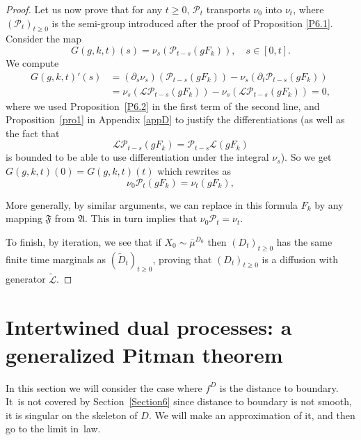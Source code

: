 \documentclass[10pt]{amsart}
\theoremstyle{plain}
\theoremstyle{definition}
\newcommand{\SL}{{\mathscr L}}
\newcommand{\SP}{{\mathscr P}}
\let\wi\widetilde
\newcommand{\fA}{\mathfrak{A}}
\newcommand{\fF}{\mathfrak{F}}
\begin{document}
\begin{proof}
Let us now prove that for any $t\geq 0$, $\SP_t$ transports $\nu_0$ into $\nu_t$, where $(\SP_t)_{t\geq 0}$ is the semi-group introduced after the proof of Proposition \ref{P6.1}. Consider the map
\begin{equation}
G(g,k,t)(s)=\nu_s\left(\SP_{t-s}(gF_k)\right), \quad s\in[0,t].
\end{equation}
We compute
\begin{equation}
\begin{split}
G(g,k,t)'(s)&=(\partial_s\nu_s)\left(\SP_{t-s}(gF_k)\right)-\nu_s\left(\partial_t\SP_{t-s}(gF_k)\right)\\
&=\nu_s\left(\SL \SP_{t-s}(gF_k)\right)-\nu_s\left(\SL \SP_{t-s}(gF_k)\right)=0,
\end{split}
\end{equation}
where we used Proposition~\ref{P6.2} in the first term of the second line, and Proposition~\ref{pro1} in Appendix \ref{appD} to justify the differentiations (as well as the fact that
\[
\SL \SP_{t-s}(gF_k)=\SP_{t-s}\SL (gF_k)
\]
is bounded to be able to use differentiation under the integral $\nu_s$).
So we get $ G(g,k,t)(0)=G(g,k,t)(t)$ which rewrites as
\begin{equation}
\nu_0\SP_t(gF_k)=\nu_t(gF_k),
\end{equation}\par
More generally, by similar arguments, we can replace in this formula $F_k$ by any mapping $\fF$ from $\fA$.
This in turn implies that $\nu_0\SP_t=\nu_t$.
\par
To finish, by iteration, we see that if $X_0\sim \bar\mu^{D_0}$ then $(D_t)_{t\ge0}$ has the same finite time marginals as $(\wi D_t)_{t\ge0}$, proving that $(D_t)_{t\ge0}$ is a diffusion with generator $\wi \SL$.
\end{proof}

\section{Intertwined dual processes: a generalized Pitman theorem}
\label{Section4}

In this section we will consider the case where $f^D$ is the distance to boundary. It~is not covered by Section~\ref{Section6} since distance to boundary is not smooth, it is singular on the skeleton of $D$. We will make an approximation of it, and then go to the limit in~law.
\end{document}
